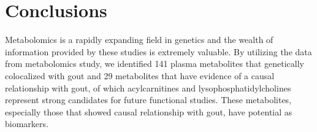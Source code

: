 \documentclass[gucdd,article,submit,pdftex,moreauthors]{Definitions/mdpi}
\begin{document}
\section{Conclusions}

Metabolomics is a rapidly expanding field in genetics and the wealth of information provided by these studies is extremely valuable.
By utilizing the data from metabolomics study, we identified 141 plasma metabolites that genetically colocalized with gout and 29 metabolites that have evidence of a causal relationship with gout, of which acylcarnitines and lysophosphatidylcholines represent strong candidates for future functional studies.
These metabolites, especially those that showed causal relationship with gout, have potential as biomarkers.


\vspace{6pt}




\end{document}

